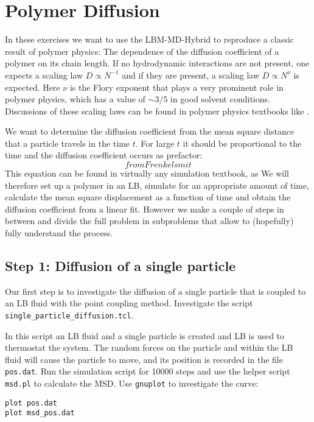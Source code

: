 
\chapter{Polymer Diffusion}
In these exercises we want to use the LBM-MD-Hybrid to reproduce a classic
result of polymer physics: The dependence of the diffusion coefficient
of a polymer on its chain length. If no hydrodynamic interactions
are not present, one expects a scaling law $D \propto N^{-1}$ and if 
they are present, a scaling law $D \propto N^{\nu}$ is expected. 
Here $\nu$ is the Flory exponent that plays a very prominent role
in polymer physics, which has a value of $\sim 3/5$ in good solvent
conditions. Discussions of these scaling laws can be found
in polymer physics textbooks like \cite{degennes, doi, rubinstein}.


We want to determine the diffusion coefficient from the mean square
distance that a particle travels in the time $t$. For large $t$ it should
be proportional to the time and the diffusion coefficient occurs as 
prefactor: 
\begin{equation}
  from Frenkelsmit
  \label{eq:msd}
\end{equation}
This equation can be found in virtually any simulation textbook, as 
\cite{frenkel}
We will therefore set up a polymer in an LB, simulate for an appropriate
amount of time, calculate the mean square displacement as a function of
time and obtain the diffusion coefficient from a linear fit. However
we make a couple of steps in between and divide the full problem in 
subproblems that allow to (hopefully) fully understand the process.

\section{Step 1: Diffusion of a single particle}
Our first step is to investigate the diffusion of a single particle
that is coupled to an LB fluid with the point coupling method.
Investigate the script  \lstinline|single_particle_diffusion.tcl|.

In this script an LB fluid and a single particle is created and LB is
used to thermostat the system. The random forces on the particle and
within the LB fluid will cause the particle to move, and its position
is recorded in the file  \lstinline|pos.dat|. Run the simulation script for 10000 steps
and use the helper script  \lstinline|msd.pl| to calculate the MSD. Use  \lstinline|gnuplot|
to investigate the curve:

{\vspace{0,2cm}\small
\begin{lstlisting}[numbers=none]
plot pos.dat
plot msd_pos.dat
\end{lstlisting}\vspace{0,2cm}
}

